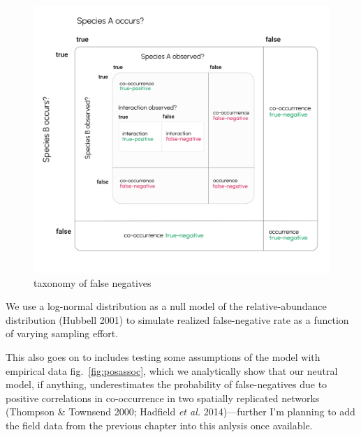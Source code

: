 \documentclass[10pt,oneside]{article}
\makeatletter
\def\maxwidth{\ifdim\Gin@nat@width>\linewidth\linewidth
\else\Gin@nat@width\fi}
\let\Oldincludegraphics\includegraphics
\renewcommand{\includegraphics}[1]{\Oldincludegraphics[width=\maxwidth]{#1}}
\makeatother
\begin{document}
\begin{figure}
\hypertarget{fig:fnrtaxonomy}{%
\centering
\includegraphics{./figures/ch2.png}
\caption{taxonomy of false negatives}\label{fig:fnrtaxonomy}
}
\end{figure}

We use a log-normal distribution as a null model of the
relative-abundance distribution (Hubbell 2001) to simulate realized
false-negative rate as a function of varying sampling effort.

This also goes on to includes testing some assumptions of the model with
empirical data fig.~\ref{fig:posassoc}, which we analytically show that
our neutral model, if anything, underestimates the probability of
false-negatives due to positive correlations in co-occurrence in two
spatially replicated networks (Thompson \& Townsend 2000; Hadfield
\emph{et al.} 2014)---further I'm planning to add the field data from
the previous chapter into this anlysis once available.
\end{document}
